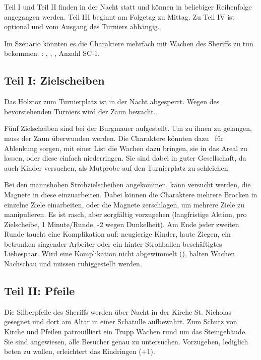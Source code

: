 {	

		\noindent
		Teil I und Teil II finden in der Nacht statt und können in beliebiger Reihenfolge angegangen werden. Teil III beginnt am Folgetag zu Mittag. Zu Teil IV ist optional und vom Ausgang des Turniers abhängig.

		Im Szenario könnten es die Charaktere mehrfach mit Wachen des Sheriffs zu tun bekommen. : , , , Anzahl SC-1.

		\subsection{Teil I: Zielscheiben}

		Das Holztor zum Turnierplatz ist in der Nacht abgesperrt. Wegen des bevorstehenden Turniers wird der Zaun bewacht.

		Fünf Zielscheiben sind bei der Burgmauer aufgestellt. Um zu ihnen zu gelangen, muss der Zaun überwunden werden. Die Charaktere könnten dazu \zB~für Ablenkung sorgen, mit einer List die Wachen dazu bringen, sie in das Areal zu lassen, oder diese einfach niederringen. Sie sind dabei in guter Gesellschaft, da auch Kinder versuchen, als Mutprobe auf den Turnierplatz zu schleichen.

		Bei den mannshohen Strohzielscheiben angekommen, kann versucht werden, die Magnete in diese einzuarbeiten. Dabei können die Charaktere mehrere Brocken in einzelne Ziele einarbeiten, oder die Magnete zerschlagen, um mehrere Ziele zu manipulieren. Es ist rasch, aber sorgfältig vorzugehen (langfristige Aktion,  pro Zielscheibe, 1 Minute/Runde, -2 wegen Dunkelheit). Am Ende jeder zweiten Runde taucht eine Komplikation auf: neugierige Kinder, laute Ziegen, ein betrunken singender Arbeiter oder ein hinter Strohballen beschäftigtes Liebespaar. Wird eine Komplikation nicht abgewimmelt (), halten Wachen Nachschau und müssen ruhiggestellt werden.

		\subsection{Teil II: Pfeile}

		Die Silberpfeile des Sheriffs werden über Nacht in der Kirche St. Nicholas gesegnet und dort am Altar in einer Schatulle aufbewahrt. Zum Schutz von Kirche und Pfeilen patrouilliert ein Trupp Wachen rund um das Steingebäude. Sie sind angewiesen, alle Besucher genau zu untersuchen. Vorzugeben, lediglich beten zu wollen, erleichtert das Eindringen (+1).

}
